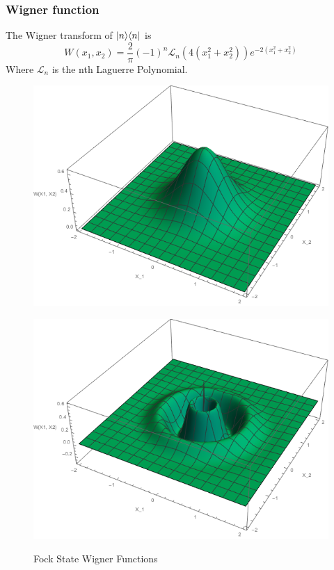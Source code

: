 \subsubsection{Wigner function}
The Wigner transform of $| n \rangle\langle n |$ is\autocite[65]{Walls2008}
\begin{equation}
	W(x_1, x_2) = \frac{2}{\pi} {(-1)}^n \mathscr{L}_n(4(x_1^2+x_2^2))e^{-2(x_1^2+x_2^2)}
\end{equation}
Where $\mathscr{L}_n$ is the nth Laguerre Polynomial.
\begin{figure}[h]
	\begin{minipage}[b]{.5\linewidth}
		\centering \large \includegraphics[width=1\textwidth]{Images/W Function-n=0.png}
		\label{fig:n=0}
	\end{minipage}%
	\begin{minipage}[b]{.5\linewidth}
		\centering\large \includegraphics[width = 1\textwidth]{Images/W Function-n=10.png}
		\label{fig:n=10}
	\end{minipage}
	\caption{Fock State Wigner Functions}\label{Wfunctions}
\end{figure}


